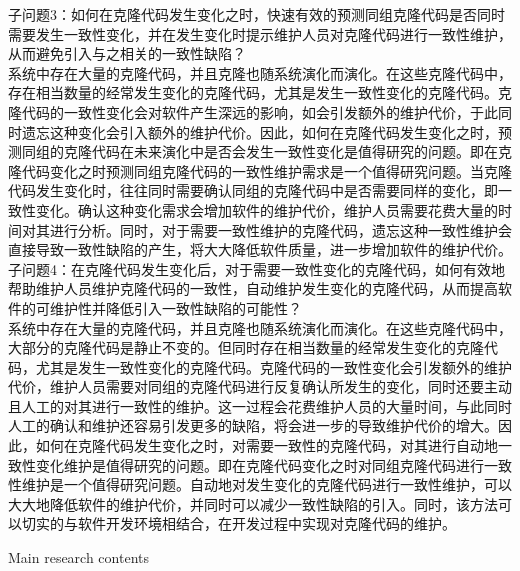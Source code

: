 子问题3：如何在克隆代码发生变化之时，快速有效的预测同组克隆代码是否同时需要发生一致性变化，并在发生变化时提示维护人员对克隆代码进行一致性维护，从而避免引入与之相关的一致性缺陷？\\

系统中存在大量的克隆代码，并且克隆也随系统演化而演化。在这些克隆代码中，存在相当数量的经常发生变化的克隆代码，尤其是发生一致性变化的克隆代码。克隆代码的一致性变化会对软件产生深远的影响，如会引发额外的维护代价，于此同时遗忘这种变化会引入额外的维护代价。因此，如何在克隆代码发生变化之时，预测同组的克隆代码在未来演化中是否会发生一致性变化是值得研究的问题。即在克隆代码变化之时预测同组克隆代码的一致性维护需求是一个值得研究问题。当克隆代码发生变化时，往往同时需要确认同组的克隆代码中是否需要同样的变化，即一致性变化。确认这种变化需求会增加软件的维护代价，维护人员需要花费大量的时间对其进行分析。同时，对于需要一致性维护的克隆代码，遗忘这种一致性维护会直接导致一致性缺陷的产生，将大大降低软件质量，进一步增加软件的维护代价。\\

子问题4：在克隆代码发生变化后，对于需要一致性变化的克隆代码，如何有效地帮助维护人员维护克隆代码的一致性，自动维护发生变化的克隆代码，从而提高软件的可维护性并降低引入一致性缺陷的可能性？\\

系统中存在大量的克隆代码，并且克隆也随系统演化而演化。在这些克隆代码中，大部分的克隆代码是静止不变的。但同时存在相当数量的经常发生变化的克隆代码，尤其是发生一致性变化的克隆代码。克隆代码的一致性变化会引发额外的维护代价，维护人员需要对同组的克隆代码进行反复确认所发生的变化，同时还要主动且人工的对其进行一致性的维护。这一过程会花费维护人员的大量时间，与此同时人工的确认和维护还容易引发更多的缺陷，将会进一步的导致维护代价的增大。因此，如何在克隆代码发生变化之时，对需要一致性的克隆代码，对其进行自动地一致性变化维护是值得研究的问题。即在克隆代码变化之时对同组克隆代码进行一致性维护是一个值得研究问题。自动地对发生变化的克隆代码进行一致性维护，可以大大地降低软件的维护代价，并同时可以减少一致性缺陷的引入。同时，该方法可以切实的与软件开发环境相结合，在开发过程中实现对克隆代码的维护。




{Main research contents}

